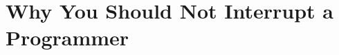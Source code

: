 \documentclass[11pt,singleside]{myfithesis2}
\begin{document}
\chapter{Why You Should Not Interrupt a Programmer}\label{app:programmer}
%
\begin{figure}[htp] 
\cite{programmerInterrupted}
\end{figure}  
\end{document}
